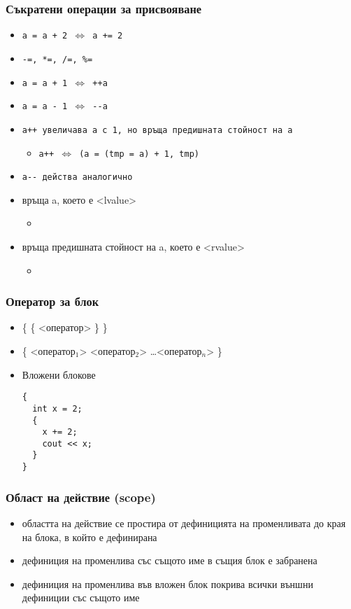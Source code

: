 \documentclass[alsotrans]{beamerswitch}
\begin{document}
\begin{frame}
  \frametitle{Съкратени операции за присвояване}

  \begin{itemize}[<+->]
  \item \tt{a = a + 2} $\Leftrightarrow$ \tt{a += 2}
  \item \tt{-=}, \tt{*=}, \tt{/=}, \tt{\%=}
  \item \tt{a = a + 1}  $\Leftrightarrow$ \tt{++a}
  \item \tt{a = a - 1}  $\Leftrightarrow$ \tt{-{}-a}
  \item \tt{a++} увеличава a с 1, но връща предишната стойност на \tt a
    \begin{itemize}
    \item \tt{a++} $\Leftrightarrow$ \tt{(a = (tmp = a) + 1, tmp)}
    \end{itemize}
  \item \tt{a-{}-} действа аналогично
  \item {} връща a, което е \alert{<lvalue>}
    \begin{itemize}
    \item \exa {}
    \end{itemize}
  \item {} връща предишната стойност на a, което е \alert{<rvalue>}
    \begin{itemize}
    \item \exa {} 
    \end{itemize}
  \end{itemize}
\end{frame}

\begin{frame}[fragile]
  \frametitle{Оператор за блок}

  \begin{itemize}[<+->]
  \item \tta\{ \{ <оператор> \} \tta\}
  \item \tta\{ <оператор$_1$> <оператор$_2$> \ldots <оператор$_n$> \tta\}
  \item Вложени блокове\\
\begin{lstlisting}
{
  int x = 2;
  {
    x += 2;
    cout << x;
  }
}
\end{lstlisting}
  \end{itemize}
\end{frame}

\begin{frame}
  \frametitle{Област на действие (scope)}

  \begin{itemize}[<+->]
  \item областта на действие се простира от дефиницията на
    променливата до края на блока, в който е дефинирана
  \item дефиниция на променлива със същото име в същия блок е
    забранена
  \item дефиниция на променлива във вложен блок покрива всички външни
    дефиниции със същото име
  \end{itemize}
\end{frame}
\end{document}
